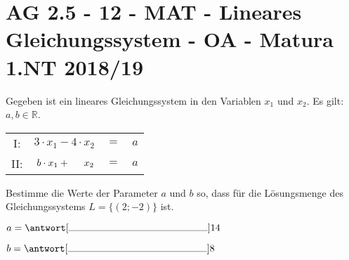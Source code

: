 \section{AG 2.5 - 12 - MAT - Lineares Gleichungssystem - OA - Matura 1.NT 2018/19}

\begin{beispiel}[AG 2.5]{1}
Gegeben ist ein lineares Gleichungssystem in den Variablen $x_1$ und $x_2$. Es gilt: $a,b\in\mathbb{R}$.\vspace{0,5cm}

\begin{tabular}{crcl}
I:&$3\cdot x_1-4\cdot x_2$&$=$&$a$\\
II:&$b\cdot x_1+\hspace{0,5cm}x_2$&$=$&$a$\\ \hline
\end{tabular}\vspace{0,5cm}

Bestimme die Werte der Parameter $a$ und $b$ so, dass für die Lösungsmenge des Gleichungssystems $L=\{(2;-2)\}$ ist.\leer

$a=\antwort[\rule{5cm}{0.3pt}]{14}$\leer

$b=\antwort[\rule{5cm}{0.3pt}]{8}$
\end{beispiel}